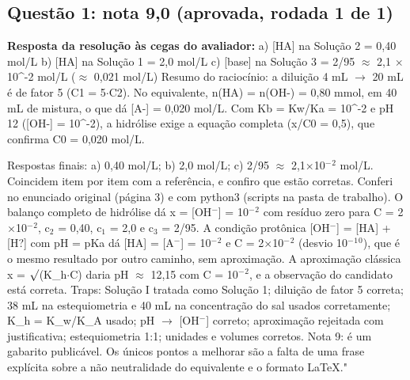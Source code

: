 \documentclass{article}%
\begin{document}
\subsection*{Questão 1: nota 9,0 (aprovada, rodada 1 de 1)}%
\textbf{Resposta da resolução às cegas do avaliador:} a) {[}HA{]} na Solução 2 = 0,40 mol/L\newline%
b) {[}HA{]} na Solução 1 = 2,0 mol/L\newline%
c) {[}base{]} na Solução 3 = 2/95 $\approx$ 2,1 $\times$ 10\^{}{-}2 mol/L ($\approx$ 0,021 mol/L)\newline%
\newline%
Resumo do raciocínio: a diluição 4 mL $\to$ 20 mL é de fator 5 (C1 = 5$\cdot$C2). No equivalente, n(HA) = n(OH{-}) = 0,80 mmol, em 40 mL de mistura, o que dá {[}A{-}{]} = 0,020 mol/L. Com Kb = Kw/Ka = 10\^{}{-}2 e pH 12 ({[}OH{-}{]} = 10\^{}{-}2), a hidrólise exige a equação completa (x/C0 = 0,5), que confirma C0 = 0,020 mol/L.\par %
Respostas finais: a) 0,40 mol/L; b) 2,0 mol/L; c) 2/95 $\approx$ 2,1$\times$10$^{-}$$^2$ mol/L. Coincidem item por item com a referência, e confiro que estão corretas. Conferi no enunciado original (página 3) e com python3 (scripts na pasta de trabalho). O balanço completo de hidrólise dá x = {[}OH$^{-}${]} = 10$^{-}$$^2$ com resíduo zero para C = 2$\times$10$^{-}$$^2$, c$_{2}$ = 0,40, c$_{1}$ = 2,0 e c$_{3}$ = 2/95. A condição protônica {[}OH$^{-}${]} = {[}HA{]} + {[}H?{]} com pH = pKa dá {[}HA{]} = {[}A$^{-}${]} = 10$^{-}$$^2$ e C = 2$\times$10$^{-}$$^2$ (desvio 10$^{-}$$^{1}$$^{0}$), que é o mesmo resultado por outro caminho, sem aproximação. A aproximação clássica x = $\surd$(K\_h$\cdot$C) daria pH $\approx$ 12,15 com C = 10$^{-}$$^2$, e a observação do candidato está correta. Traps: Solução I tratada como Solução 1; diluição de fator 5 correta; 38 mL na estequiometria e 40 mL na concentração do sal usados corretamente; K\_h = K\_w/K\_A usado; pH $\to$ {[}OH$^{-}${]} correto; aproximação rejeitada com justificativa; estequiometria 1:1; unidades e volumes corretos. Nota 9: é um gabarito publicável. Os únicos pontos a melhorar são a falta de uma frase explícita sobre a não neutralidade do equivalente e o formato LaTeX."%
\end{document}
